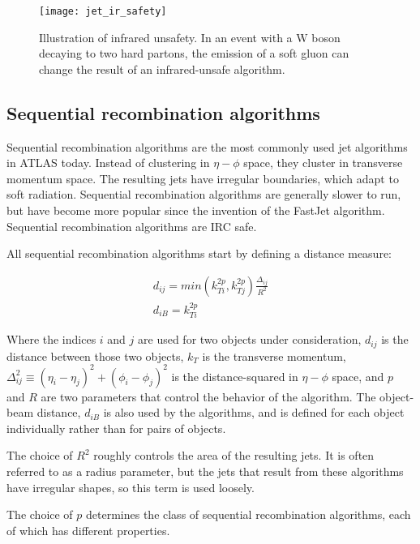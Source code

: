 \begin{figure}[!ht]
    \centering
\texttt{[image: jet\_ir\_safety]}
\caption{Illustration of infrared unsafety.
In an event with a W boson decaying to two hard partons, the emission of a soft gluon can change the result of an infrared-unsafe algorithm.}
\label{fig:jet_ir_safety}
\end{figure}\cite{jet-jetography}

\subsection{Sequential recombination algorithms}\label{subec:jet_seq_recombination}

Sequential recombination algorithms are the most commonly used jet algorithms in ATLAS today.
Instead of clustering in $\eta-\phi$ space, they cluster in transverse momentum space.
The resulting jets have irregular boundaries, which adapt to soft radiation.
Sequential recombination algorithms are generally slower to run,
but have become more popular since the invention of the FastJet\cite{jet-fastjet} algorithm.
Sequential recombination algorithms are IRC safe.

All sequential recombination algorithms start by defining a distance measure:

\begin{align}\label{eq:jet_distance}
    d_{ij} = min\left(k_{Ti}^{2p}, k_{Tj}^{2p}\right)\frac{\Delta_{ij}}{R^2} \\
    d_{iB} = k_{Ti}^{2p}
\end{align}

Where the indices $i$ and $j$ are used for two objects under consideration,
$d_{ij}$ is the distance between those two objects, $k_T$ is the transverse momentum,
$\Delta_{ij}^2 \equiv (\eta_i-\eta_j)^2 + (\phi_i-\phi_j)^2$ is the distance-squared in $\eta-\phi$ space,
and $p$ and $R$ are two parameters that control the behavior of the algorithm.
The object-beam distance, $d_{iB}$ is also used by the algorithms, and is defined for each object individually rather than for pairs of objects.

The choice of $R^2$ roughly controls the area of the resulting jets.
It is often referred to as a radius parameter, but the jets that result from these algorithms have irregular shapes,
so this term is used loosely.

The choice of $p$ determines the class of sequential recombination algorithms, each of which has different properties.

